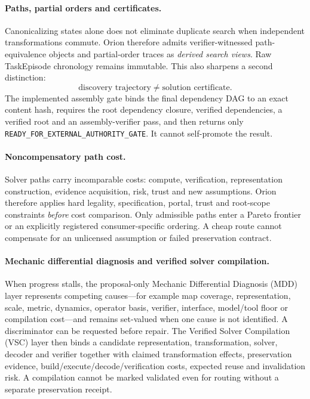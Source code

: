 \paragraph{Paths, partial orders and certificates.}
Canonicalizing states alone does not eliminate duplicate search when independent transformations commute. Orion therefore admits verifier-witnessed path-equivalence objects and partial-order traces as \emph{derived search views}. Raw TaskEpisode chronology remains immutable. This also sharpens a second distinction:
\[
\text{discovery trajectory}\neq\text{solution certificate}.
\]
The implemented assembly gate binds the final dependency DAG to an exact content hash, requires the root dependency closure, verified dependencies, a verified root and an assembly-verifier pass, and then returns only \texttt{READY\_FOR\_EXTERNAL\_AUTHORITY\_GATE}. It cannot self-promote the result.

\paragraph{Noncompensatory path cost.}
Solver paths carry incomparable costs: compute, verification, representation construction, evidence acquisition, risk, trust and new assumptions. Orion therefore applies hard legality, specification, portal, trust and root-scope constraints \emph{before} cost comparison. Only admissible paths enter a Pareto frontier or an explicitly registered consumer-specific ordering. A cheap route cannot compensate for an unlicensed assumption or failed preservation contract.

\paragraph{Mechanic differential diagnosis and verified solver compilation.}
When progress stalls, the proposal-only Mechanic Differential Diagnosis (MDD) layer represents competing causes---for example map coverage, representation, scale, metric, dynamics, operator basis, verifier, interface, model/tool floor or compilation cost---and remains set-valued when one cause is not identified. A discriminator can be requested before repair. The Verified Solver Compilation (VSC) layer then binds a candidate representation, transformation, solver, decoder and verifier together with claimed transformation effects, preservation evidence, build/execute/decode/verification costs, expected reuse and invalidation risk. A compilation cannot be marked validated even for routing without a separate preservation receipt.

